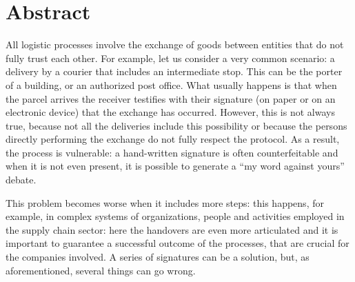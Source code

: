 \chapter*{Abstract} %
\label{abstract}


\iffalse



  Sommario è un breve riassunto del lavoro svolto dove si descrive l'obiettivo, l'oggetto della tesi, le 
metodologie e le tecniche usate, i dati elaborati e la spiegazione delle conclusioni alle quali siete arrivati.  

Il sommario dell’elaborato consiste al massimo di 3 pagine e deve contenere le seguenti informazioni:
\begin{itemize}
  \item contesto e motivazioni 
  \item breve riassunto del problema affrontato
  \item tecniche utilizzate e/o sviluppate
  \item risultati raggiunti, sottolineando il contributo personale del laureando/a
\end{itemize}

\fi

All logistic processes involve the exchange of goods between entities that do not fully trust each other. For example, let us consider a very common scenario: a delivery by a courier that includes an intermediate stop. This can be the porter of a building, or an authorized post office. What usually happens is that when the parcel arrives the receiver testifies with their signature (on paper or on an electronic device) that the exchange has occurred. However, this is not always true, because not all the deliveries include this possibility or because the persons directly performing the exchange do not fully respect the protocol. As a result, the process is vulnerable: a hand-written signature is often counterfeitable and when it is not even present, it is possible to generate a ``my word against yours'' debate.

This problem becomes worse when it includes more steps: this happens, for example, in complex systems of organizations, people and activities employed in the supply chain sector: here the handovers are even more articulated and it is important to guarantee a successful outcome of the processes, that are crucial for the companies involved. A series of signatures can be a solution, but, as aforementioned, several things can go wrong.

